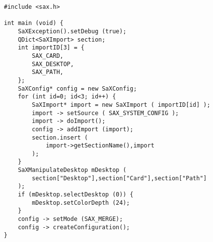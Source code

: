 \begin{Command}{12cm}
\begin{small}
\begin{verbatim}
#include <sax.h>

int main (void) {
    SaXException().setDebug (true);
    QDict<SaXImport> section;
    int importID[3] = {
        SAX_CARD,
        SAX_DESKTOP,
        SAX_PATH,
    };
    SaXConfig* config = new SaXConfig;
    for (int id=0; id<3; id++) {
        SaXImport* import = new SaXImport ( importID[id] );
        import -> setSource ( SAX_SYSTEM_CONFIG );
        import -> doImport();
        config -> addImport (import);
        section.insert (
            import->getSectionName(),import
        );
    }
    SaXManipulateDesktop mDesktop (
        section["Desktop"],section["Card"],section["Path"]
    );
    if (mDesktop.selectDesktop (0)) {
        mDesktop.setColorDepth (24);
    }
    config -> setMode (SAX_MERGE);
    config -> createConfiguration();
}
\end{verbatim}
\end{small}
\end{Command}
